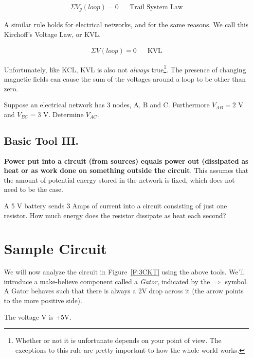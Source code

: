 \begin{align}
\Sigma V_g(loop)=0	&&\text{Trail System Law}
\end{align}

A similar rule holds for electrical networks, and for the same reasons. We call this Kirchoff's Voltage Law, or KVL. 

\begin{align}
\Sigma V(loop)=0	&&\text{KVL}
\end{align}

Unfortunately, like KCL, KVL is also not \emph{always} true\footnote{Whether or not it is unfortunate depends on your point of view. The exceptions to this rule are pretty important to how the whole world works.}. The presence of changing magnetic fields can cause the sum of the voltages around a loop to be other than zero.

\begin{alevel}
Suppose an electrical network has 3 nodes, A, B and C. Furthermore $V_{AB}=2$ V and $V_{BC}=3$ V. Determine $V_{AC}$.
\end{alevel}

\subsection{Basic Tool III.} 
\textbf{Power put into a circuit (from sources) equals power out (dissipated as heat or as work done on something outside the circuit}. This assumes that the amount of potential energy stored in the network is fixed, which does not need to be the case.\par

\begin{alevel}
A 5 V battery sends 3 Amps of current into a circuit consisting of just one resistor. How much energy does the resistor dissipate as heat each second?
\end{alevel}

\section{Sample Circuit}
We will now analyze the circuit in Figure~\ref{F:3CKT} using the above tools. We'll introduce a make-believe component called a \emph{Gator}, indicated by the $\Rightarrow$ symbol. A Gator behaves such that there is always a 2V drop across it (the arrow points to the more positive side).

\par
The voltage V is +5V.
\par

